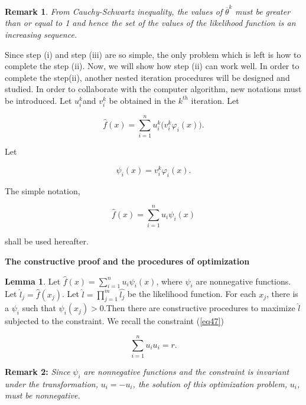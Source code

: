 \documentclass [18pt]{article}
\begin{document}
\textbf{Remark 1}. \textit{From Cauchy-Schwartz inequality, the values of }$\overline \theta ^k$\textit{ must be greater than or equal to 1 and hence the set of the values of the likelihood function is an increasing sequence. }

Since step (i) and step (iii) are so simple, the only problem which is left
is how to complete the step (ii). Now, we will show how step (ii) can work
well. In order to complete the step(ii), another nested iteration procedures
will be designed and studied. In order to collaborate with the computer
algorithm, new notations must be introduced. Let $u_i^k $and $v_i^k $ be
obtained in the $k^{th}$ iteration. Let


\begin{equation}
\label{eq63}
\widehat{f}(x) = \sum\limits_{i = 1}^n {u_i^k (v_i^k } \varphi _i (x)).
\end{equation}



Let


\begin{equation}
\label{eq64}
\psi _i (x) = v_i^k \varphi _i (x).
\end{equation}



The simple notation,


\begin{equation}
\label{eq65}
\widehat{f}(x) = \sum\limits_{i = 1}^n {u_i } \psi _i (x)
\end{equation}



\noindent
shall be used hereafter.

\textbf{The constructive proof and the procedures of optimization}

\textbf{Lemma 1}. Let $\widehat{f}(x) = \sum\limits_{i = 1}^n {u_i
} \psi _i (x)$, where $\psi _i $ are nonnegative functions. Let
$\widehat{l}_j = \widehat{f}(x_j )$. Let $\widehat{l} = \prod\limits_{j =
1}^m {\widehat{l_j }} $ be the likelihood function. For each $x_j $, there
is a $\psi _i $ such that $\psi _i (x_j ) > 0$.Then there are constructive
procedures to maximize $\widehat{l}$ subjected to the constraint. We recall
the constraint (\ref{eq47})


\[
\sum\limits_{i = 1}^n {u_i u_i } = r.
\]



\textbf{Remark 2:} \textit{Since }$\psi _i $\textit{ are nonnegative functions and the constraint is invariant under the transformation, }$u_i = - u_i $\textit{, the solution of this optimization problem, }$u_i $\textit{, must be nonnegative.}
\end{document}
